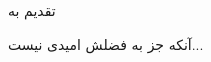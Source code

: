 \begin{acknowledgementpage}

\vspace{1.5cm}

{\nastaliq
{
تقدیم به

آنکه جز به فضلش امیدی نیست...
}}\end{acknowledgementpage}
\newpage